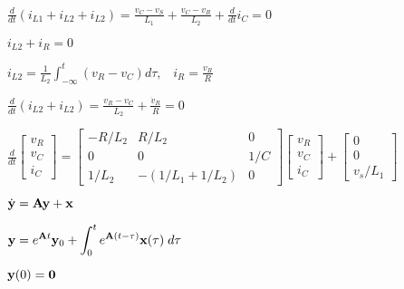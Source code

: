 \documentclass{article}
\def\lthtmlcheckvsize{\ifdim\ht\sizebox<\vsize 
  \ifdim\wd\sizebox<\hsize\expandafter\hfill\fi \expandafter\vfill
  \else\expandafter\vss\fi}%
\begin{document}
{\newpage\clearpage
{}%
$\displaystyle \frac{d}{dt}(i_{L1}+i_{L2}+i_{L2})
=\frac{v_C-v_S}{L_1}+\frac{v_C-v_R}{L_2}+\frac{d}{dt}i_C=0$%
\lthtmlindisplaymathZ
\lthtmlcheckvsize\clearpage}

{\newpage\clearpage
{}%
$ i_{L2}+i_R=0$%
\lthtmlindisplaymathZ
\lthtmlcheckvsize\clearpage}

{\newpage\clearpage
{}%
$\displaystyle i_{L2}=\frac{1}{L_2}\int_{-\infty}^t (v_R-v_C)d\tau,\;\;\;
i_R=\frac{v_R}{R}$%
\lthtmlindisplaymathZ
\lthtmlcheckvsize\clearpage}

{\newpage\clearpage
{}%
$\displaystyle \frac{d}{dt}(i_{L2}+i_{L2})=\frac{v_R-v_C}{L_2}+\frac{\dot{v}_R}{R}=0$%
\lthtmlindisplaymathZ
\lthtmlcheckvsize\clearpage}

{\newpage\clearpage
{}%
$\displaystyle \frac{d}{dt}\left[\begin{array}{c}v_R\\v_C\\i_C\end{array}\right]
=\left[\begin{array}{ccc}-R/L_2&R/L_2&0\\0 & 0 & 1/C\\1/L_2&-(1/L_1+1/L_2)&0
\end{array}\right]
\left[\begin{array}{c}v_R\\v_C\\i_C\end{array}\right]
+\left[\begin{array}{c}0\\0\\v_s/L_1\end{array}\right]$%
\lthtmlindisplaymathZ
\lthtmlcheckvsize\clearpage}

{\newpage\clearpage
{}%
$\displaystyle \dot{\bf y}={\bf Ay}+{\bf x}$%
\lthtmlindisplaymathZ
\lthtmlcheckvsize\clearpage}

{\newpage\clearpage
{}%
$\displaystyle {\bf y}=e^{{\bf A}t}{\bf y}_0+\int_0^t e^{{\bf A}(t-\tau)} {\bf x}(\tau)\;d\tau$%
\lthtmlindisplaymathZ
\lthtmlcheckvsize\clearpage}

{\newpage\clearpage
{}%
$ {\bf y}(0)={\bf0}$%
\lthtmlindisplaymathZ
\lthtmlcheckvsize\clearpage}
\end{document}
